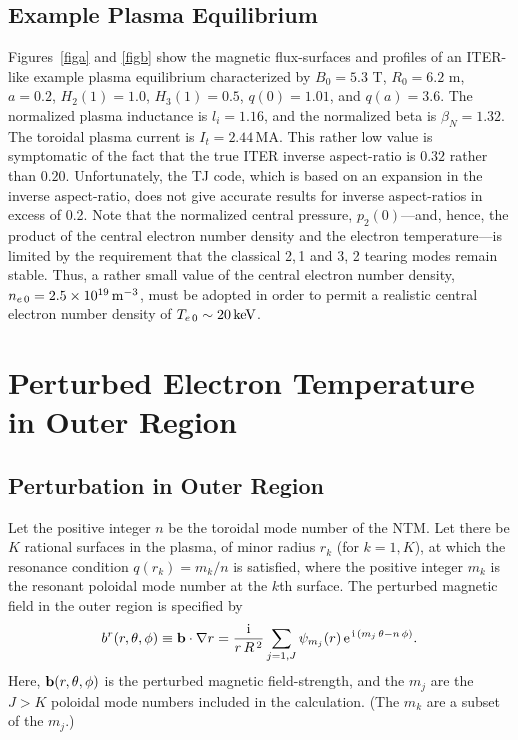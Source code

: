 \documentclass[12pt,prb,aps]{revtex4-1}
\begin{document}
\subsection{Example Plasma Equilibrium}
Figures~\ref{figa} and \ref{figb} show the magnetic flux-surfaces and profiles of an ITER-like  example plasma equilibrium characterized by 
$B_0=5.3$ T, $R_0=6.2$ m, $a=0.2$, $H_2(1)=1.0$,  $H_3(1)= 0.5$, $q(0)=1.01$, and  $q(a)=3.6$.  The normalized plasma inductance is
$l_i=1.16$, and the normalized beta is $\beta_N= 1.32$.
The toroidal plasma current is $I_t=2.44$\,MA. This rather low value
is symptomatic of the fact that the true ITER inverse aspect-ratio is  $0.32$ rather than $0.20$. Unfortunately, the TJ code, which is based on
an expansion in the inverse aspect-ratio,  does not give accurate results for inverse aspect-ratios
in excess of 0.2. 
Note that the normalized central pressure, $p_2(0)$---and, hence, the product of the central electron number density and the electron temperature---is  limited by the requirement that the classical
 2,\,1 and 3, 2 tearing modes remain stable. 
Thus,  a rather small value of the central electron number density, $n_{e\,0}=2.5\times 10^{19}\,{\rm m}^{-3}$, 
must be adopted  in order to permit a realistic central electron number density of $T_{e\,0}\sim 20\,{\rm keV}$. 

\section{Perturbed Electron Temperature  in Outer Region}\label{s3}
\subsection{Perturbation in Outer Region}
Let the positive integer $n$ be the toroidal mode number of the NTM. Let there be $K$ rational surfaces in the plasma, of minor radius $r_k$ (for $k=1,K$),  at which the resonance condition
$q(r_k) = m_k/n$ is satisfied, where the positive integer $m_k$ is the resonant poloidal mode number at the $k$th surface. The perturbed magnetic field in the outer region is specified by\,\cite{tear9,tear10}
\begin{equation}
b^r(r,\theta,\phi)\equiv {\bf b}\cdot\nabla r = \frac{{\rm i}}{r\,R^{\,2}}\sum_{j=1,J} \psi_{m_j}(r)\,{\rm e}^{\,{\rm i}\,(m_j\,\theta-n\,\phi)}.
\end{equation}
Here, ${\bf b}(r,\theta,\phi)$ is the perturbed magnetic field-strength, and the $m_j$ are the  $J>K$ poloidal mode numbers included in the calculation. (The $m_k$ are a subset of the $m_j$.) 
\end{document}
